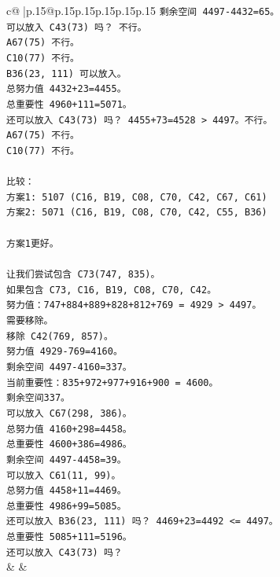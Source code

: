 \documentclass{article}
\begin{document}
{\begin{supertabular}{c@{$\;$}|p{.15\linewidth}@{}p{.15\linewidth}p{.15\linewidth}p{.15\linewidth}p{.15\linewidth}p{.15\linewidth}}
{{{\texttt{剩余空间 4497{-}4432=65。} \\
\texttt{可以放入 C43(73) 吗？ 不行。} \\
\texttt{A67(75) 不行。} \\
\texttt{C10(77) 不行。} \\
\texttt{B36(23, 111) 可以放入。} \\
\texttt{总努力值 4432+23=4455。} \\
\texttt{总重要性 4960+111=5071。} \\
\texttt{还可以放入 C43(73) 吗？ 4455+73=4528 > 4497。不行。} \\
\texttt{A67(75) 不行。} \\
\texttt{C10(77) 不行。} \\
\\ 
\texttt{比较：} \\
\texttt{方案1: 5107 (C16, B19, C08, C70, C42, C67, C61)} \\
\texttt{方案2: 5071 (C16, B19, C08, C70, C42, C55, B36)} \\
\\ 
\texttt{方案1更好。} \\
\\ 
\texttt{让我们尝试包含 C73(747, 835)。} \\
\texttt{如果包含 C73, C16, B19, C08, C70, C42。} \\
\texttt{努力值：747+884+889+828+812+769 = 4929 > 4497。} \\
\texttt{需要移除。} \\
\texttt{移除 C42(769, 857)。} \\
\texttt{努力值 4929{-}769=4160。} \\
\texttt{剩余空间 4497{-}4160=337。} \\
\texttt{当前重要性：835+972+977+916+900 = 4600。} \\
\texttt{剩余空间337。} \\
\texttt{可以放入 C67(298, 386)。} \\
\texttt{总努力值 4160+298=4458。} \\
\texttt{总重要性 4600+386=4986。} \\
\texttt{剩余空间 4497{-}4458=39。} \\
\texttt{可以放入 C61(11, 99)。} \\
\texttt{总努力值 4458+11=4469。} \\
\texttt{总重要性 4986+99=5085。} \\
\texttt{还可以放入 B36(23, 111) 吗？ 4469+23=4492 <= 4497。} \\
\texttt{总重要性 5085+111=5196。} \\
\texttt{还可以放入 C43(73) 吗？} \\
            }
        }
    }
    & & \\ \\


\end{supertabular}}
\end{document}
